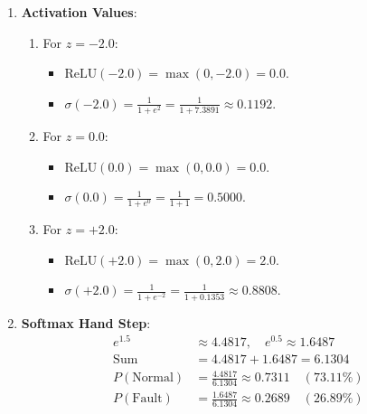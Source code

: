 \begin{enumerate}
    \item \textbf{Activation Values}:
    \begin{enumerate}
        \item For $z = -2.0$:
        \begin{itemize}
            \item $\text{ReLU}(-2.0) = \max(0, -2.0) = \mathbf{0.0}$.
            \item $\sigma(-2.0) = \frac{1}{1 + e^2} = \frac{1}{1 + 7.3891} \approx \mathbf{0.1192}$.
        \end{itemize}
        \item For $z = 0.0$:
        \begin{itemize}
            \item $\text{ReLU}(0.0) = \max(0, 0.0) = \mathbf{0.0}$.
            \item $\sigma(0.0) = \frac{1}{1 + e^0} = \frac{1}{1 + 1} = \mathbf{0.5000}$.
        \end{itemize}
        \item For $z = +2.0$:
        \begin{itemize}
            \item $\text{ReLU}(+2.0) = \max(0, 2.0) = \mathbf{2.0}$.
            \item $\sigma(+2.0) = \frac{1}{1 + e^{-2}} = \frac{1}{1 + 0.1353} \approx \mathbf{0.8808}$.
        \end{itemize}
    \end{enumerate}

    \item \textbf{Softmax Hand Step}:
    \begin{align*}
    e^{1.5} &\approx 4.4817, \quad e^{0.5} \approx 1.6487 \\
    \text{Sum} &= 4.4817 + 1.6487 = 6.1304 \\
    P(\text{Normal}) &= \frac{4.4817}{6.1304} \approx \mathbf{0.7311} \quad (73.11\%) \\
    P(\text{Fault}) &= \frac{1.6487}{6.1304} \approx \mathbf{0.2689} \quad (26.89\%)
    \end{align*}


\end{enumerate}
